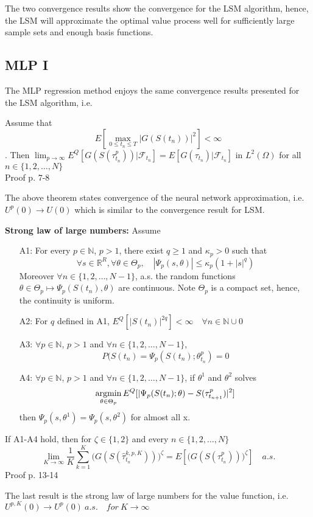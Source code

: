 The two convergence results show the convergence for the LSM algorithm, hence, the LSM will approximate the optimal value process well for sufficiently large sample sets and enough basis functions.

\subsection{MLP I}
The MLP regression method enjoys the same convergence results presented for the LSM algorithm, i.e.
\begin{theorem}\label{NNConvergence1}
Assume that 
$$E[\max_{0\leq t_n \leq T} |G(S(t_n))|^2]< \infty$$. 
Then $\lim_{p \to \infty} E^Q[G(S(\tau^{p}_{t_n}))| \mathcal{F}_{t_n}]= E[G(\tau_{t_n})|\mathcal{F}_{t_n}]$ in $L^2(\Omega)$ for all $n \in \{1,2,\ldots, N\}$\\
Proof p. 7-8 \parencite{Lelong19}
\end{theorem}
The above theorem states convergence of the neural network approximation, i.e. $U^{p}(0) \to U(0)$ which is similar to the convergence result for LSM. 
\begin{theorem}{\textbf{Strong law of large numbers: }}\label{NNConvergence2}
Assume
\begin{enumerate}
\item[A1:] For every $p\in \mathbb{N}$, $p>1$, there exist $q \geq 1$ and $\kappa_p>0$ such that
$$\forall s \in \mathbb{R}^{R}, \forall \theta \in \Theta_p, \quad |\Psi_p(s,\theta)| \leq \kappa_p (1+|s|^q) $$
Moreover $\forall n \in \{1,2,\ldots, N-1\}$, a.s. the random functions $\theta \in \Theta_p \mapsto \Psi_p(S(t_n), \theta)$ are continuous. Note $\Theta_p$ is a compact set, hence, the continuity is uniform.
\item[A2:] For $q$ defined in A1, $E^Q[|S(t_n)|^{2q}]<\infty \quad \forall n \in \mathbb{N} \cup 0$
\item[A3:] $\forall p \in \mathbb{N}$, $p>1$ and $\forall n \in \{1,2,\ldots, N-1\}$, 
$$P(S(t_n)=\Psi_{p}(S(t_n);\theta_{t_n}^{p})=0$$
\item[A4:] $\forall p \in \mathbb{N}$, $p>1$ and $\forall n \in \{1,2,\ldots, N-1\}$, if $\theta^{1}$ and $\theta^{2}$ solves 
\begin{align*}
\operatorname*{argmin}_{\theta \in \Theta_p} E^Q[|\Psi_p(S(t_n); \theta)- S(\tau_{t_{n+1}}^{p})|^2]
\end{align*}
then $\Psi_p(s,\theta^{1})=\Psi_p(s,\theta^{2})$ for almost all x.
\end{enumerate}
If A1-A4 hold, then for $\zeta\in \{1,2\}$ and every $n\in \{1,2,\ldots,N\}$
\begin{equation}
\lim_{K\to \infty} \dfrac{1}{K} \sum_{k=1}^{K} \bigg(G(S(\hat{\tau}_{t_n}^{k,p,K}))\bigg)^{\zeta} = E[\bigg(G(S(\tau_{t_n}^{p}))\bigg)^{\zeta}] \quad a.s.
\end{equation}
Proof p. 13-14 \parencite{Lelong19}
\end{theorem}
The last result is the strong law of large numbers for the value function, i.e. $U^{p,K}(0) \to U^{p}(0) \ a.s. \quad for \ K \to \infty$

